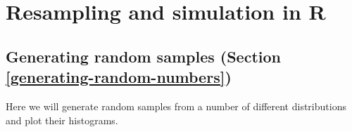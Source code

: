 \documentclass[12pt,]{book}
\begin{document}
\hypertarget{resampling-and-simulation-in-r}{%
\chapter{Resampling and simulation in R}\label{resampling-and-simulation-in-r}}

\hypertarget{generating-random-samples-section-refgenerating-random-numbers}{%
\section{Generating random samples (Section \ref{generating-random-numbers})}\label{generating-random-samples-section-refgenerating-random-numbers}}

Here we will generate random samples from a number of different distributions and plot their histograms.
\end{document}
